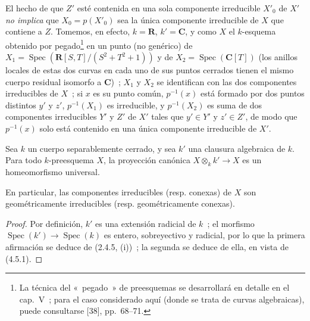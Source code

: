\begin{remark}[4.5.20]
\label{IV.2.4.5.20-fr}
El hecho de que $Z'$ esté contenida en una sola componente irreducible $X'_0$
de $X'$ \emph{no implica} que $X_0=p(X'_0)$ sea la única componente irreducible
de $X$ que contiene a $Z$. Tomemos, en efecto, $k=\mathbf R$, $k'=\mathbf C$, y
como $X$ el $k$-esquema obtenido por pegado\footnote{La técnica del
«~pegado~» de preesquemas se desarrollará en detalle en el cap.~V~; para el
caso considerado aquí (donde se trata de curvas algebraicas), puede consultarse
[38], pp.~68--71.} en un punto (no genérico) de
$X_1=\operatorname{Spec}(\mathbf R[S,T]/(S^2+T^2+1))$ y de
$X_2=\operatorname{Spec}(\mathbf C[T])$ (los anillos locales de estas dos
curvas en cada uno de sus puntos cerrados tienen el mismo cuerpo residual
isomorfo a $\mathbf C$)~; $X_1$ y $X_2$ se identifican con las dos componentes
irreducibles de $X$~; si $x$ es su punto común, $p^{-1}(x)$ está formado por
dos puntos distintos $y'$ y $z'$, $p^{-1}(X_1)$ es irreducible, y
$p^{-1}(X_2)$ es suma de dos componentes irreducibles $Y'$ y $Z'$ de $X'$
tales que $y'\in Y'$ y $z'\in Z'$, de modo que $p^{-1}(x)$ solo está contenido
en una única componente irreducible de $X'$.
\end{remark}

\begin{proposition}[4.5.21]
\label{IV.2.4.5.21-fr}
Sea $k$ un cuerpo separablemente cerrado, y sea $k'$ una clausura algebraica de
$k$. Para todo $k$-preesquema $X$, la proyección canónica
$X\otimes_k k'\to X$ es un homeomorfismo universal.


En particular, las componentes irreducibles \textup{(resp.} conexas\textup{)} de $X$ son
geométricamente irreducibles \textup{(resp.} geométricamente conexas\textup{)}.
\end{proposition}

\begin{proof}
Por definición, $k'$ es una extensión radicial de $k$~; el morfismo
$\operatorname{Spec}(k')\to\operatorname{Spec}(k)$ es entero, sobreyectivo y
radicial, por lo que la primera afirmación se deduce de (2.4.5, (i))~; la
segunda se deduce de ella, en vista de (4.5.1).
\end{proof}

